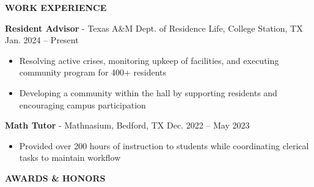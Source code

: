 \documentclass[18pt]{article}
\begin{document}
\vspace{-0.75\baselineskip}
\begin{center}
    \textbf{WORK EXPERIENCE}
    \hrulefill
\end{center}
\vspace{-0.5\baselineskip}

\textbf{Resident Advisor} - Texas A\&M Dept. of Residence Life, College Station, TX \hfill{Jan. 2024 – Present}

\vspace{-0.5\baselineskip}
\begin{itemize}[noitemsep]
  \item Resolving active crises, monitoring upkeep of facilities, and executing community program for 400+ residents
  \item Developing a community within the hall by supporting residents and encouraging campus participation
\end{itemize}

\vspace{-0.5\baselineskip}
\textbf{Math Tutor} - Mathnasium, Bedford, TX \hfill Dec. 2022 – May 2023 \hspace{-3pt}

\vspace{-0.5\baselineskip}
\begin{itemize}[noitemsep]
  \item Provided over 200 hours of instruction to students while coordinating clerical tasks to maintain workflow
\end{itemize}

\vspace{-0.75\baselineskip}
\begin{center}
    \textbf{AWARDS \& HONORS}
    \hrulefill
\end{center}
\vspace{-0.75\baselineskip}
\end{document}
